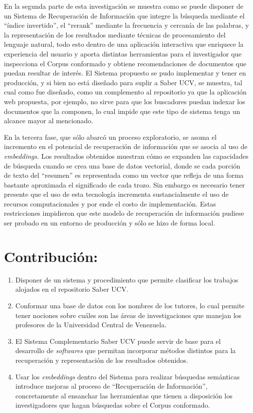 \documentclass[
  12pt,
  openany]{book}
\begin{document}
En la segunda parte de esta investigación se muestra como se puede disponer de un Sistema de Recuperación de Información que integre la búsqueda mediante el ``índice invertido'', el ``rerank'' mediante la frecuencia y cercanía de las palabras, y la representación de los resultados mediante técnicas de procesamiento del lenguaje natural, todo esto dentro de una aplicación interactiva que enriquece la experiencia del usuario y aporta distintas herramientas para el investigador que inspecciona el Corpus conformado y obtiene recomendaciones de documentos que puedan resultar de interés. El Sistema propuesto se pudo implementar y tener en producción, y si bien no está diseñado para suplir a Saber UCV, se muestra, tal cual como fue diseñado, como un complemento al repositorio ya que la aplicación web propuesta, por ejemplo, no sirve para que los buscadores puedan indexar los documentos que la componen, lo cual impide que este tipo de sistema tenga un alcance mayor al mencionado.

En la tercera fase, que sólo abarcó un proceso exploratorio, se asoma el incremento en el potencial de recuperación de información que se asocia al uso de \emph{embeddings.} Los resultados obtenidos muestran cómo se expanden las capacidades de búsqueda cuando se crea una base de datos vectorial, donde se cada porción de texto del ``resumen'' es representada como un vector que refleja de una forma bastante aproximada el significado de cada trozo. Sin embargo es necesario tener presente que el uso de esta tecnología incrementa sustancialmente el uso de recursos computacionales y por ende el costo de implementación. Estas restricciones impidieron que este modelo de recuperación de información pudiese ser probado en un entorno de producción y sólo se hizo de forma local.

\hypertarget{conclusionescontri}{%
\section{Contribución:}\label{conclusionescontri}}

\begin{enumerate}
\def\labelenumi{\arabic{enumi}.}
\item
  Disponer de un sistema y procedimiento que permite clasificar los trabajos alojados en el repositorio Saber UCV.
\item
  Conformar una base de datos con los nombres de los tutores, lo cual permite tener nociones sobre cuáles son las áreas de investigaciones que manejan los profesores de la Universidad Central de Venezuela.
\item
  El Sistema Complementario Saber UCV puede servir de base para el desarrollo de \emph{softwares} que permitan incorporar métodos distintos para la recuperación y representación de los resultados obtenidos.
\item
  Usar los \emph{embeddings} dentro del Sistema para realizar búsquedas semánticas introduce mejoras al proceso de ``Recuperación de Información'', concretamente al ensanchar las herramientas que tienen a disposición los investigadores que hagan búsquedas sobre el Corpus conformado.
\end{enumerate}
\end{document}
